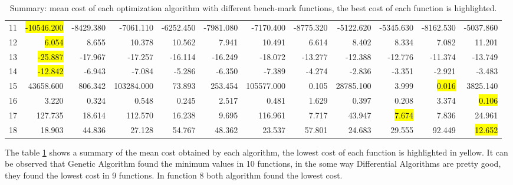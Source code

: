 \documentclass[12pt]{article}
\begin{document}
\begin{landscape}
\begin{table}[H]
\begin{tabular}{rrrrrrrrrrrr}
	11 & \hl{-10546.200} &      -8429.380 &      -7061.110 &          -6252.450 &      -7981.080 &      -7170.400 &      -8775.320 &      -5122.620 &          -5345.630 &      -8162.530 &      -5037.860 \\
	12 &      \hl{6.054} &          8.655 &         10.378 &             10.562 &          7.941 &         10.491 &          6.614 &          8.402 &              8.334 &          7.082 &         11.201 \\
	13 &    \hl{-25.887} &        -17.967 &        -17.257 &            -16.114 &        -16.249 &        -18.072 &        -13.277 &        -12.388 &            -12.776 &        -11.374 &        -13.749 \\
	14 &    \hl{-12.842} &         -6.943 &         -7.084 &             -5.286 &         -6.350 &         -7.389 &         -4.274 &         -2.836 &             -3.351 &         -2.921 &         -3.483 \\
	15 &  43658.600 &        806.342 &     103284.000 &             73.893 &        253.454 &     105577.000 &          0.105 &      28785.100 &              3.999 &          \hl{0.016} &       3825.140 \\
	16 &      3.220 &          0.324 &          0.548 &              0.245 &          2.517 &          0.481 &          1.629 &          0.397 &              0.208 &          3.374 &          \hl{0.106} \\
	17 &    127.735 &         18.614 &        112.570 &             16.238 &          9.695 &        116.961 &          7.717 &         43.947 &              \hl{7.674} &          7.836 &         24.961 \\
	18 &     18.903 &         44.836 &         27.128 &             54.767 &         48.362 &         23.537 &         57.801 &         24.683 &             29.555 &         92.449 &         \hl{12.652} \\
	\bottomrule
\end{tabular}
\caption{Summary: mean cost of each optimization algorithm with different bench-mark functions, the best cost of each function is highlighted.} 
	\label{tab:summary}
\end{table}

The table \ref{tab:summary} shows a summary of the mean cost obtained by each algorithm, the lowest cost of each function is highlighted in yellow. It can be observed that Genetic Algorithm found the minimum values in 10 functions, in the some way Differential Algorithms are pretty good, they found the lowest cost in 9 functions. In function 8 both algorithm found the lowest cost. 
\end{landscape}
\end{document}
